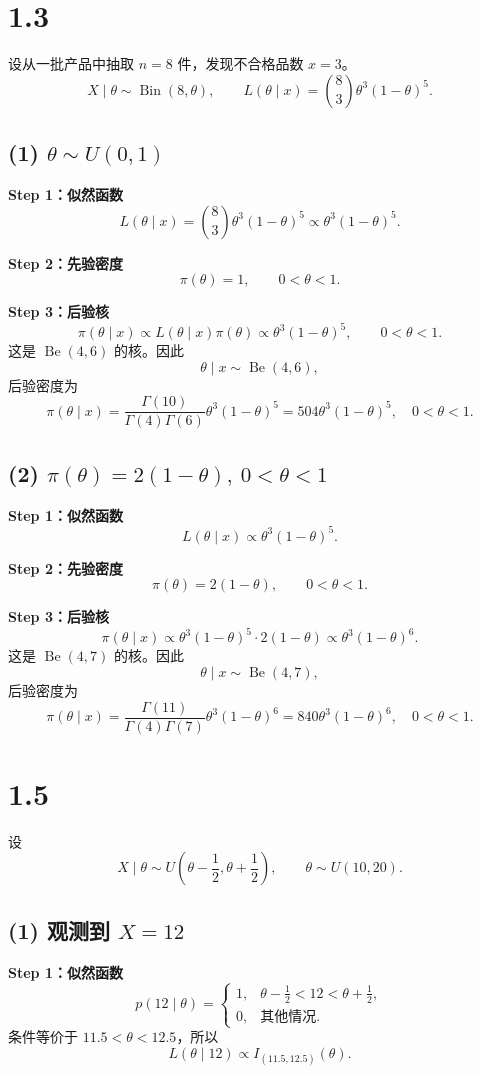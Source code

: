 \documentclass[UTF8,zihao=-4]{ctexart}
\begin{document}
\section*{1.3}
设从一批产品中抽取 \(n=8\) 件，发现不合格品数 \(x=3\)。
\[
X\mid\theta\sim\operatorname{Bin}(8,\theta),\qquad
L(\theta\mid x)={8\choose3}\theta^3(1-\theta)^5.
\]

\subsection*{(1) \(\theta\sim U(0,1)\)}
\textbf{Step 1：似然函数}
\[
L(\theta\mid x)={8\choose3}\theta^3(1-\theta)^5
\propto\theta^3(1-\theta)^5.
\]

\textbf{Step 2：先验密度}
\[
\pi(\theta)=1,\qquad0<\theta<1.
\]

\textbf{Step 3：后验核}
\[
\pi(\theta\mid x)\propto L(\theta\mid x)\pi(\theta)
\propto\theta^3(1-\theta)^5,\qquad0<\theta<1.
\]
这是 \(\operatorname{Be}(4,6)\) 的核。因此
\[
\boxed{\theta\mid x\sim\operatorname{Be}(4,6)},
\]
后验密度为
\[
\boxed{\pi(\theta\mid x)=\frac{\Gamma(10)}{\Gamma(4)\Gamma(6)}
\theta^3(1-\theta)^5=504\theta^3(1-\theta)^5,\quad0<\theta<1.}
\]

\subsection*{(2) \(\pi(\theta)=2(1-\theta),\ 0<\theta<1\)}
\textbf{Step 1：似然函数}
\[
L(\theta\mid x)\propto\theta^3(1-\theta)^5.
\]

\textbf{Step 2：先验密度}
\[
\pi(\theta)=2(1-\theta),\qquad0<\theta<1.
\]

\textbf{Step 3：后验核}
\[
\pi(\theta\mid x)\propto\theta^3(1-\theta)^5\cdot2(1-\theta)
\propto\theta^3(1-\theta)^6.
\]
这是 \(\operatorname{Be}(4,7)\) 的核。因此
\[
\boxed{\theta\mid x\sim\operatorname{Be}(4,7)},
\]
后验密度为
\[
\boxed{\pi(\theta\mid x)=\frac{\Gamma(11)}{\Gamma(4)\Gamma(7)}
\theta^3(1-\theta)^6=840\theta^3(1-\theta)^6,\quad0<\theta<1.}
\]

\section*{1.5}
设
\[
X\mid\theta\sim U\left(\theta-\frac12,\theta+\frac12\right),
\qquad\theta\sim U(10,20).
\]

\subsection*{(1) 观测到 \(X=12\)}
\textbf{Step 1：似然函数}
\[
p(12\mid\theta)=
\begin{cases}
1,&\theta-\frac12<12<\theta+\frac12,\\
0,&\text{其他情况}.
\end{cases}
\]
条件等价于 \(11.5<\theta<12.5\)，所以
\[
L(\theta\mid12)\propto I_{(11.5,12.5)}(\theta).
\]
\end{document}
